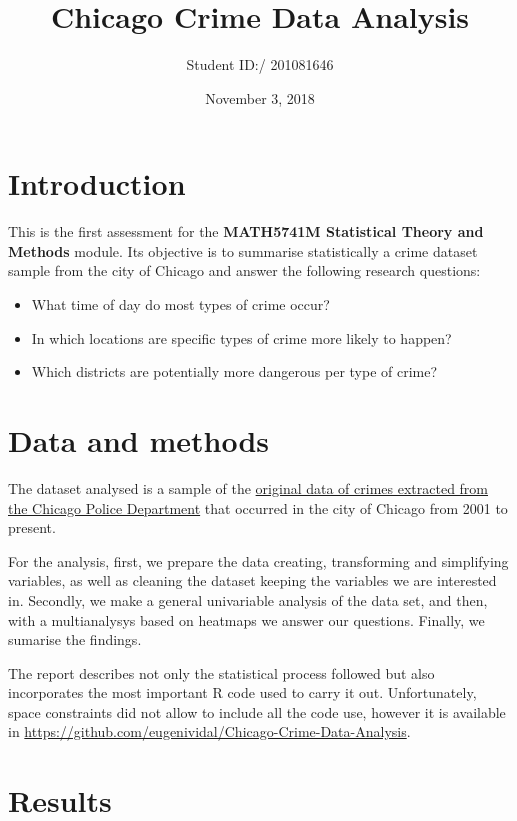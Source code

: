 \documentclass[]{article}
\title{Chicago Crime Data Analysis}
\author{Student ID:/ 201081646}
\date{November 3, 2018}
\begin{document}
\maketitle

\section{Introduction}\label{introduction}

This is the first assessment for the \textbf{MATH5741M Statistical
Theory and Methods} module. Its objective is to summarise statistically
a crime dataset sample from the city of Chicago and answer the following
research questions:

\begin{itemize}
\item
  What time of day do most types of crime occur?
\item
  In which locations are specific types of crime more likely to happen?
\item
  Which districts are potentially more dangerous per type of crime?
\end{itemize}

\section{Data and methods}\label{data-and-methods}

The dataset analysed is a sample of the
\href{https://data.cityofchicago.org/Public-Safety/Crimes-2001-to-present/ijzp-q8t2}{original
data of crimes extracted from the Chicago Police Department} that
occurred in the city of Chicago from 2001 to present.

For the analysis, first, we prepare the data creating, transforming and
simplifying variables, as well as cleaning the dataset keeping the
variables we are interested in. Secondly, we make a general univariable
analysis of the data set, and then, with a multianalysys based on
heatmaps we answer our questions. Finally, we sumarise the findings.

The report describes not only the statistical process followed but also
incorporates the most important R code used to carry it out.
Unfortunately, space constraints did not allow to include all the code
use, however it is available in
\url{https://github.com/eugenividal/Chicago-Crime-Data-Analysis}.

\section{Results}\label{results}
\end{document}
